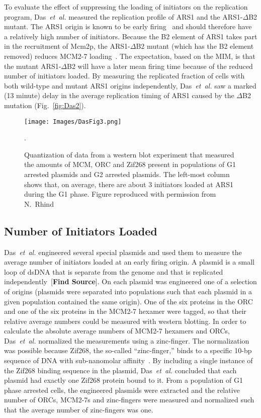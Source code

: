 {		To evaluate the effect of suppressing the loading of initiators on the replication program, Das~\emph{et~al.} measured the replication profile of ARS1 and the ARS1-$\Delta$B2 mutant.
		The ARS1 origin is known to be early firing~\cite{OriDB} and should therefore have a relatively high number of initiators.
		Because the B2 element of ARS1 takes part in the recruitment of Mcm2p, the ARS1-$\Delta$B2 mutant (which has the B2 element removed) reduces MCM2-7 loading~\cite{ARS1Mutant}.
		The expectation, based on the MIM, is that the mutant ARS1-$\Delta$B2 will have a later mean firing time because of the reduced number of initiators loaded.
		By measuring the replicated fraction of cells with both wild-type and mutant ARS1 origins independently, Das~\emph{et~al.} saw a marked (13 minute) delay in the average replication timing of ARS1 caused by the $\Delta$B2 mutation (Fig.~\ref{fig:Das2}).
		
		\begin{figure}[tbh]
			\begin{center}
				\texttt{[image: Images/DasFig3.png]}
			\end{center}
				\caption[Absolute Number of Loaded MCMs at ARS1]{\label{fig:Das3} Quantization of data from a western blot experiment that measured the amounts of MCM, ORC and Zif268 present in populations of G1 arrested plasmids and G2 arrested plasmids.
					The left-most column shows that, on average, there are about 3 initiators loaded at ARS1 during the G1 phase.
					Figure reproduced with permission from N.~Rhind~\cite{Rhind}}.
		\end{figure}
		
		
		\subsection{Number of Initiators Loaded}
		\label{subsec:NoInitiatorsLoaded}
		
		Das~\emph{et~al.} engineered several special plasmids and used them to measure the average number of initiators loaded at an early firing origin.
		A plasmid is a small loop of dsDNA that is separate from the genome and that is replicated independently~[\textbf{Find Source}].
		On each plasmid was engineered one of a selection of origins (plasmids were separated into populations such that each plasmid in a given population contained the same origin).
		One of the six proteins in the ORC and one of the six proteins in the MCM2-7 hexamer were tagged, so that their relative average numbers could be measured with western blotting.
		In order to calculate the absolute average numbers of MCM2-7 hexamers and ORCs, Das~\emph{et~al.} normalized the measurements using a zinc-finger.
		The normalization was possible because Zif268, the so-called ``zinc-finger,'' binds to a specific 10-bp sequence of DNA with sub-nanomolar affinity~\cite{ZincFingers}.
		By including a single instance of the Zif268 binding sequence in the plasmid, Das~\emph{et~al.} concluded that each plasmid had exactly one Zif268 protein bound to it.
		From a population of G1 phase arrested cells, the engineered plasmids were extracted and the relative number of ORCs, MCM2-7s and zinc-fingers were measured and normalized such that the average number of zinc-fingers was one.
		
}
